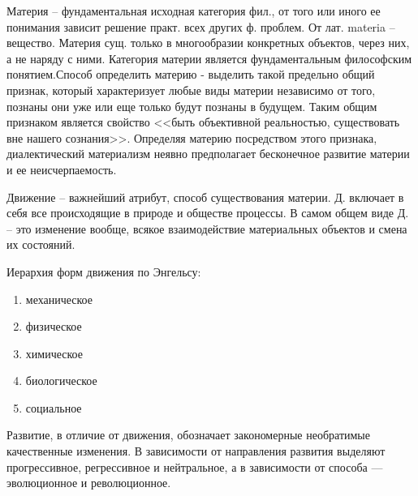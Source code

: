 Материя -- фундаментальная исходная категория фил., от того или иного ее понимания зависит решение практ. всех других ф. проблем. От лат. materia -- вещество. Материя сущ. только в многообразии конкретных объектов, через них, а не наряду с ними. Категория материи является фундаментальным философским понятием.Способ определить материю - выделить такой предельно общий признак, который характеризует любые виды материи независимо от того, познаны они уже или еще только будут познаны в будущем. Таким общим признаком является свойство <<быть объективной реальностью, существовать вне нашего сознания>>. Определяя материю посредством этого признака, диалектический материализм неявно
предполагает бесконечное развитие материи и ее неисчерпаемость.

Движение -- важнейший атрибут, способ существования материи. Д. включает в себя все происходящие в природе и обществе процессы. В самом общем виде Д. -- это изменение вообще, всякое взаимодействие материальных объектов и смена их состояний.

Иерархия форм движения по Энгельсу:
\begin{enumerate}
    \item механическое
    \item физическое
    \item химическое
    \item биологическое
    \item социальное
\end{enumerate}

Развитие, в отличие от движения, обозначает закономерные необратимые качественные изменения. В зависимости от направления развития выделяют прогрессивное, регрессивное и нейтральное, а в зависимости от способа --- эволюционное и революционное.